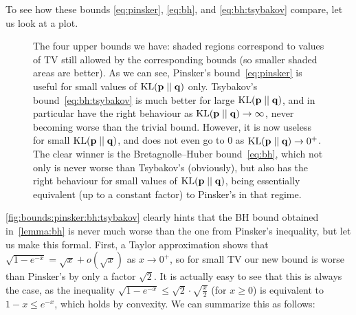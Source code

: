 \documentclass[10pt]{article}
\begin{document}
\noindent To see how these bounds \eqref{eq:pinsker}, \eqref{eq:bh}, and \eqref{eq:bh:tsybakov} compare, let us look at a plot.
\begin{figure}[H]\centering
{} 
\caption{\label{fig:bounds:pinsker:bh:tsybakov}The four upper bounds we have: shaded regions correspond to values of TV still allowed by the corresponding bounds (so smaller shaded areas are better). As we can see, Pinsker's bound~\eqref{eq:pinsker} is useful for small values of $\kldiv{\p}{\q}$ only. Tsybakov's bound~\eqref{eq:bh:tsybakov} is much better for large $\kldiv{\p}{\q}$, and in particular have the right behaviour as $\kldiv{\p}{\q}\to\infty$, never becoming worse than the trivial bound. However, it is now useless for small $\kldiv{\p}{\q}$, and does not even go to $0$ as $\kldiv{\p}{\q}\to 0^+$. The clear winner is the Bretagnolle--Huber bound~\eqref{eq:bh}, which not only is never worse than Tsybakov's (obviously), but also has the right behaviour for small values of $\kldiv{\p}{\q}$, being essentially equivalent (up to a constant factor) to Pinsker's in that regime.}
\end{figure}
\autoref{fig:bounds:pinsker:bh:tsybakov} clearly hints that the BH bound obtained in~\autoref{lemma:bh} is never much worse than the one from Pinsker's inequality, but let us make this formal. First, a Taylor approximation shows that $\sqrt{1-e^{-x}} = \sqrt{x} + o(\sqrt{x})$ as $x\to 0^+$, so for small TV our new bound is worse than Pinsker's by only a factor $\sqrt{2}$. It is actually easy to see that this is always the case, as the inequality $\sqrt{1-e^{-x}} \leq \sqrt{2}\cdot \sqrt{\frac{x}{2}}$ (for $x\geq 0$) is equivalent  to $1-x\leq e^{-x}$, which holds by convexity. We can summarize this as follows:
\end{document}

